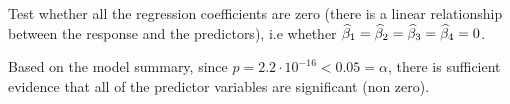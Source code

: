 Test whether all the regression coefficients are zero (there is a linear relationship
between the response and the predictors), i.e whether $\widehat{\beta}_1 = \widehat{\beta}_2 = \widehat{\beta}_3 = \widehat{\beta}_4 = 0$.

\soln* Based on the model summary, since $p = 2.2 \cdot 10^{-16} < 0.05 = \alpha$, there is sufficient evidence that all of the predictor variables are significant (non zero).